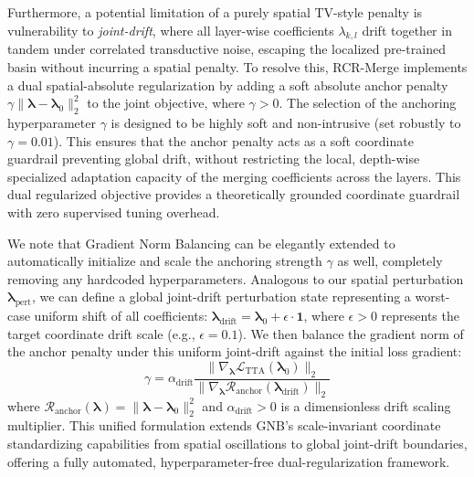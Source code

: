 Furthermore, a potential limitation of a purely spatial TV-style penalty is vulnerability to \emph{joint-drift}, where all layer-wise coefficients $\lambda_{k, l}$ drift together in tandem under correlated transductive noise, escaping the localized pre-trained basin without incurring a spatial penalty. To resolve this, RCR-Merge implements a dual spatial-absolute regularization by adding a soft absolute anchor penalty $\gamma \|\boldsymbol{\lambda} - \boldsymbol{\lambda}_0\|_2^2$ to the joint objective, where $\gamma > 0$. The selection of the anchoring hyperparameter $\gamma$ is designed to be highly soft and non-intrusive (set robustly to $\gamma = 0.01$). This ensures that the anchor penalty acts as a soft coordinate guardrail preventing global drift, without restricting the local, depth-wise specialized adaptation capacity of the merging coefficients across the layers. This dual regularized objective provides a theoretically grounded coordinate guardrail with zero supervised tuning overhead. 

We note that Gradient Norm Balancing can be elegantly extended to automatically initialize and scale the anchoring strength $\gamma$ as well, completely removing any hardcoded hyperparameters. Analogous to our spatial perturbation $\boldsymbol{\lambda}_{\text{pert}}$, we can define a global joint-drift perturbation state representing a worst-case uniform shift of all coefficients: $\boldsymbol{\lambda}_{\text{drift}} = \boldsymbol{\lambda}_0 + \epsilon \cdot \mathbf{1}$, where $\epsilon > 0$ represents the target coordinate drift scale (e.g., $\epsilon = 0.1$). We then balance the gradient norm of the anchor penalty under this uniform joint-drift against the initial loss gradient:
\begin{equation}
\gamma = \alpha_{\text{drift}} \frac{\|\nabla_{\boldsymbol{\lambda}} \mathcal{L}_{\text{TTA}}(\boldsymbol{\lambda}_0)\|_2}{\|\nabla_{\boldsymbol{\lambda}} \mathcal{R}_{\text{anchor}}(\boldsymbol{\lambda}_{\text{drift}})\|_2}
\end{equation}
where $\mathcal{R}_{\text{anchor}}(\boldsymbol{\lambda}) = \|\boldsymbol{\lambda} - \boldsymbol{\lambda}_0\|_2^2$ and $\alpha_{\text{drift}} > 0$ is a dimensionless drift scaling multiplier. This unified formulation extends GNB's scale-invariant coordinate standardizing capabilities from spatial oscillations to global joint-drift boundaries, offering a fully automated, hyperparameter-free dual-regularization framework.

